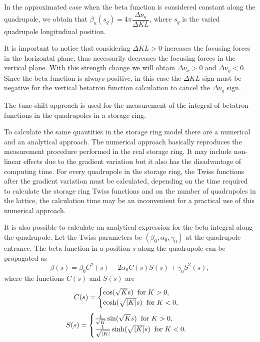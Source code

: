 In the approximated case when the beta function is considered constant along the quadrupole, we obtain that $\beta_u(s_q) = 4\pi \dfrac{\Delta \nu_u}{\Delta KL}$, where $s_q$ is the varied quadrupole longitudinal position.

It is important to notice that considering $\Delta KL > 0$ increases the focusing forces in the horizontal plane, thus necessarily decreases the focusing forces in the vertical plane. With this strength change we will obtain $\Delta \nu_x > 0$ and $\Delta \nu_y < 0$. Since the beta function is always positive, in this case the $\Delta KL$ sign must be negative for the vertical betatron function calculation to cancel the $\Delta \nu_y$ sign.

The tune-shift approach is used for the measurement of the integral of betatron functions in the quadrupoles in a storage ring.

To calculate the same quantities in the storage ring model there are a numerical and an analytical approach. The numerical approach basically reproduces the measurement procedure performed in the real storage ring. It may include non-linear effects due to the gradient variation but it also has the disadvantage of computing time. For every quadrupole in the storage ring, the Twiss functions after the gradient variation must be calculated, depending on the time required to calculate the storage ring Twiss functions and on the number of quadrupoles in the lattice, the calculation time may be an inconvenient for a practical use of this numerical approach.

It is also possible to calculate an analytical expression for the beta integral along the quadrupole. Let the Twiss parameters be $(\beta_0, \alpha_0, \gamma_0)$ at the quadrupole entrance. The beta function in a position $s$ along the quadrupole can be propagated as
\begin{equation}
\beta(s) = \beta_0 C^2(s) - 2\alpha_0 C(s)S(s) + \gamma_0S^2(s),
\end{equation}
where the functions $C(s)$ and $S(s)$ are
\[
C(s) = 
\begin{cases}
\cos(\sqrt{K}s) \hspace{0.2cm} \text{for} \hspace{0.1cm} K > 0, \\
\cosh(\sqrt{|K|}s) \hspace{0.2cm} \text{for} \hspace{0.1cm} K < 0, 
\end{cases}
\]
\[
S(s) = 
\begin{cases}
\frac{1}{\sqrt{K}}\sin(\sqrt{K}s) \hspace{0.2cm} \text{for} \hspace{0.1cm} K > 0, \\
\frac{1}{\sqrt{|K|}}\sinh(\sqrt{|K|}s) \hspace{0.2cm} \text{for} \hspace{0.1cm} K < 0.
\end{cases}
\]

